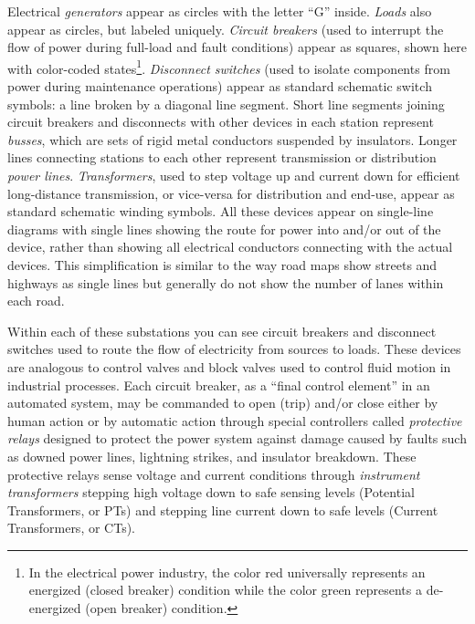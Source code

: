 Electrical \textit{generators} appear as circles with the letter ``G'' inside.  \textit{Loads} also appear as circles, but labeled uniquely.  \textit{Circuit breakers} (used to interrupt the flow of power during full-load and fault conditions) appear as squares, shown here with color-coded states\footnote{In the electrical power industry, the color red universally represents an energized (closed breaker) condition while the color green represents a de-energized (open breaker) condition.}.  \textit{Disconnect switches} (used to isolate components from power during maintenance operations) appear as standard schematic switch symbols: a line broken by a diagonal line segment.  Short line segments joining circuit breakers and disconnects with other devices in each station represent \textit{busses}, which are sets of rigid metal conductors suspended by insulators.  Longer lines connecting stations to each other represent transmission or distribution \textit{power lines}.  \textit{Transformers}, used to step voltage up and current down for efficient long-distance transmission, or vice-versa for distribution and end-use, appear as standard schematic winding symbols.  All these devices appear on single-line diagrams with single lines showing the route for power into and/or out of the device, rather than showing all electrical conductors connecting with the actual devices.  This simplification is similar to the way road maps show streets and highways as single lines but generally do not show the number of lanes within each road.      

Within each of these substations you can see circuit breakers and disconnect switches used to route the flow of electricity from sources to loads.  These devices are analogous to control valves and block valves used to control fluid motion in industrial processes.  Each circuit breaker, as a ``final control element'' in an automated system, may be commanded to open (trip) and/or close either by human action or by automatic action through special controllers called \textit{protective relays} designed to protect the power system against damage caused by faults such as downed power lines, lightning strikes, and insulator breakdown.  These protective relays sense voltage and current conditions through \textit{instrument transformers} stepping high voltage down to safe sensing levels (Potential Transformers, or PTs) and stepping line current down to safe levels (Current Transformers, or CTs).

